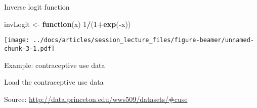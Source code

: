 \documentclass[
  ignorenonframetext,
]{beamer}
\newenvironment{Shaded}{\begin{snugshade}}{\end{snugshade}}
\newcommand{\ControlFlowTok}[1]{\textcolor[rgb]{0.13,0.29,0.53}{\textbf{#1}}}
\newcommand{\DataTypeTok}[1]{\textcolor[rgb]{0.13,0.29,0.53}{#1}}
\newcommand{\DecValTok}[1]{\textcolor[rgb]{0.00,0.00,0.81}{#1}}
\newcommand{\KeywordTok}[1]{\textcolor[rgb]{0.13,0.29,0.53}{\textbf{#1}}}
\newcommand{\NormalTok}[1]{#1}
\newcommand{\OperatorTok}[1]{\textcolor[rgb]{0.81,0.36,0.00}{\textbf{#1}}}
\newcommand{\OtherTok}[1]{\textcolor[rgb]{0.56,0.35,0.01}{#1}}
\newcommand{\StringTok}[1]{\textcolor[rgb]{0.31,0.60,0.02}{#1}}
\begin{document}
\begin{frame}[fragile]{Inverse logit function}
\protect\hypertarget{inverse-logit-function}{}

\begin{Shaded}
\begin{Highlighting}[]
\NormalTok{invLogit <-}\StringTok{ }\ControlFlowTok{function}\NormalTok{(x) }\DecValTok{1}\OperatorTok{/}\NormalTok{(}\DecValTok{1}\OperatorTok{+}\KeywordTok{exp}\NormalTok{(}\OperatorTok{-}\NormalTok{x))}
\end{Highlighting}
\end{Shaded}

\texttt{[image: ../docs/articles/session\_lecture\_files/figure-beamer/unnamed-chunk-3-1.pdf]}

\end{frame}

\begin{frame}[fragile]{Example: contraceptive use data}
\protect\hypertarget{example-contraceptive-use-data}{}

Load the contraceptive use data

\tiny

\begin{Shaded}
\end{Shaded}

Source: \url{http://data.princeton.edu/wws509/datasets/\#cuse}

\end{frame}
\end{document}

